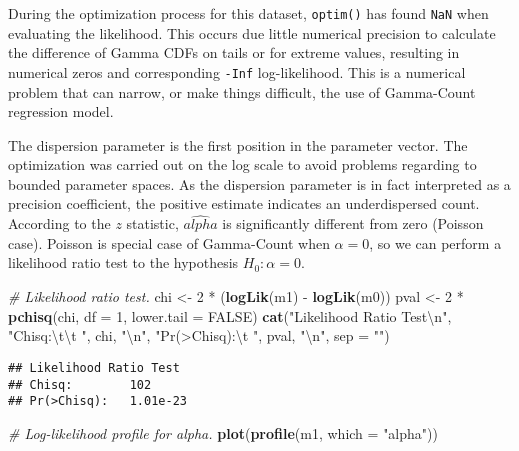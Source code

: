 \documentclass[9pt,a5paper,]{book}
\newenvironment{Shaded}{}{}
\newcommand{\KeywordTok}[1]{\textbf{{#1}}}
\newcommand{\DataTypeTok}[1]{\underline{{#1}}}
\newcommand{\DecValTok}[1]{{#1}}
\newcommand{\CharTok}[1]{{#1}}
\newcommand{\StringTok}[1]{{#1}}
\newcommand{\CommentTok}[1]{\textit{{#1}}}
\newcommand{\OtherTok}[1]{{#1}}
\newcommand{\NormalTok}[1]{{#1}}
\renewenvironment{Shaded}{\color{inputcolor}}{}
\renewcommand{\DataTypeTok}[1]{{#1}}
\theoremstyle{definition}
\theoremstyle{definition}
\theoremstyle{remark}
\begin{document}
During the optimization process for this dataset, \texttt{optim()} has
found \texttt{NaN} when evaluating the likelihood. This occurs due
little numerical precision to calculate the difference of Gamma CDFs on
tails or for extreme values, resulting in numerical zeros and
corresponding \texttt{-Inf} log-likelihood. This is a numerical problem
that can narrow, or make things difficult, the use of Gamma-Count
regression model.

The dispersion parameter is the first position in the parameter vector.
The optimization was carried out on the log scale to avoid problems
regarding to bounded parameter spaces. As the dispersion parameter is in
fact interpreted as a precision coefficient, the positive estimate
indicates an underdispersed count. According to the \(z\) statistic,
\(\hat{alpha}\) is significantly different from zero (Poisson case).
Poisson is special case of Gamma-Count when \(\alpha = 0\), so we can
perform a likelihood ratio test to the hypothesis \(H_0: \alpha = 0\).

\begin{Shaded}
\begin{Highlighting}[]
\CommentTok{# Likelihood ratio test.}
\NormalTok{chi <-}\StringTok{ }\DecValTok{2} \NormalTok{*}\StringTok{ }\NormalTok{(}\KeywordTok{logLik}\NormalTok{(m1) -}\StringTok{ }\KeywordTok{logLik}\NormalTok{(m0))}
\NormalTok{pval <-}\StringTok{ }\DecValTok{2} \NormalTok{*}\StringTok{ }\KeywordTok{pchisq}\NormalTok{(chi, }\DataTypeTok{df =} \DecValTok{1}\NormalTok{, }\DataTypeTok{lower.tail =} \OtherTok{FALSE}\NormalTok{)}
\KeywordTok{cat}\NormalTok{(}\StringTok{"Likelihood Ratio Test}\CharTok{\textbackslash{}n}\StringTok{"}\NormalTok{,}
    \StringTok{"Chisq:}\CharTok{\textbackslash{}t\textbackslash{}t}\StringTok{ "}\NormalTok{, chi, }\StringTok{"}\CharTok{\textbackslash{}n}\StringTok{"}\NormalTok{,}
    \StringTok{"Pr(>Chisq):}\CharTok{\textbackslash{}t}\StringTok{ "}\NormalTok{, pval, }\StringTok{"}\CharTok{\textbackslash{}n}\StringTok{"}\NormalTok{,}
    \DataTypeTok{sep =} \StringTok{""}\NormalTok{)}
\end{Highlighting}
\end{Shaded}

\begin{verbatim}
## Likelihood Ratio Test
## Chisq:        102
## Pr(>Chisq):   1.01e-23
\end{verbatim}

\begin{Shaded}
\begin{Highlighting}[]
\CommentTok{# Log-likelihood profile for alpha.}
\KeywordTok{plot}\NormalTok{(}\KeywordTok{profile}\NormalTok{(m1, }\DataTypeTok{which =} \StringTok{"alpha"}\NormalTok{))}
\end{Highlighting}
\end{Shaded}
\end{document}
